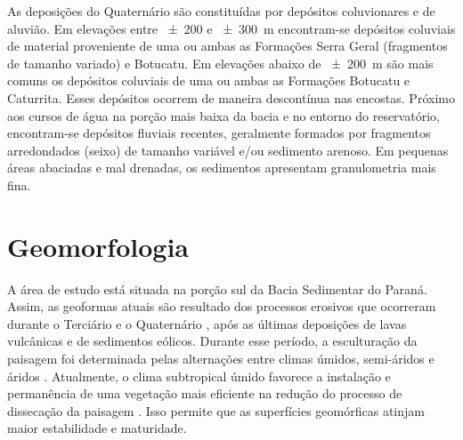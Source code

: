 As deposições do Quaternário são constituídas por depósitos coluvionares e de aluvião. Em elevações entre 
\num{\pm200} e \SI{\pm300}{\metre} encontram-se depósitos coluviais de material proveniente de uma ou ambas as 
Formações Serra Geral (fragmentos de tamanho variado) e Botucatu. Em elevações abaixo de \SI{\pm200}{\metre} 
são mais comuns os depósitos coluviais de uma ou ambas as Formações Botucatu e Caturrita. Esses depósitos 
ocorrem de maneira descontínua nas encostas. Próximo aos cursos de água na porção mais baixa da bacia e no 
entorno do reservatório, encontram-se depósitos fluviais recentes, geralmente formados por fragmentos 
arredondados (seixo) de tamanho variável e/ou sedimento arenoso. Em pequenas áreas abaciadas e mal drenadas, 
os sedimentos apresentam granulometria mais fina.

\section{Geomorfologia}
\label{sec:chap02-geomorfologia}

A área de estudo está situada na porção sul da Bacia Sedimentar do Paraná. Assim, as geoformas atuais são 
resultado dos processos erosivos que ocorreram durante o Terciário e o Quaternário \cite{Sartori2009}, após as 
últimas deposições de lavas vulcânicas e de sedimentos eólicos. Durante esse período, a esculturação da 
paisagem foi determinada pelas alternações entre climas úmidos, semi-áridos e áridos \cite{Sartori2009}. 
Atualmente, o clima subtropical úmido favorece a instalação e permanência de uma vegetação mais eficiente na 
redução do processo de dissecação da paisagem \cite{Sartori2009, NascimentoEtAl2010}. Isso permite que as 
superfícies geomórficas atinjam maior estabilidade e maturidade.


